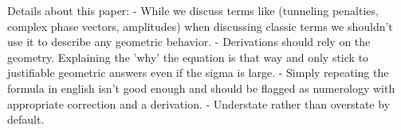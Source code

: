 Details about this paper:
- While we discuss terms like (tunneling penalties, complex phase vectors, amplitudes) when discussing classic terms we shouldn't use it to describe any geometric behavior.
- Derivations should rely on the geometry. Explaining the 'why' the equation is that way and only stick to justifiable geometric answers even if the sigma is large.
- Simply repeating the formula in english isn't good enough and should be flagged as numerology with appropriate correction and a derivation.
- Understate rather than overstate by default.